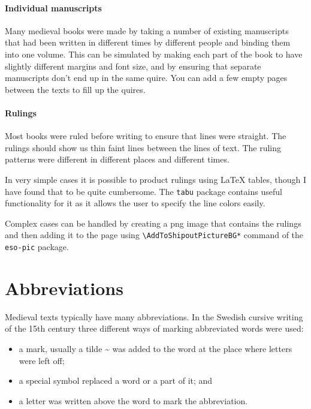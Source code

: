 \documentclass[a4paper]{article}
\newcommand{\package}[1]{\texttt{#1}}
\newcommand{\ltxncmd}[1]{\texttt{\textbackslash{}#1}}
\begin{document}
\paragraph{Individual manuscripts}

Many medieval books were made by taking a number of existing
manuscripts that had been written in different times by different
people and binding them into one volume. This can be simulated by
making each part of the book to have slightly different margins and
font size, and by ensuring that separate manuscripts don't end up in
the same quire. You can add a few empty pages between the texts to
fill up the quires.

\paragraph{Rulings}

Most books were ruled before writing to ensure that lines were
straight. The rulings should show us thin faint lines between the
lines of text. The ruling patterns were different in different places
and different times. 

In very simple cases it is possible to product rulings using LaTeX
tables, though I have found that to be quite cumbersome. The
\package{tabu} package contains useful functionality for it as it
allows the user to specify the line colors easily.

Complex cases can be handled by creating a png image that contains the
rulings and then adding it to the page using
\ltxncmd{AddToShipoutPictureBG*} command of the \package{eso-pic}
package.



\section{Abbreviations}\label{sec_abbrs}

Medieval texts typically have many abbreviations. In the Swedish
cursive writing of the 15th century three different ways of marking
abbreviated words were used:

\begin{itemize}
\item a mark, usually a tilde \~{} was added to the word at the place
  where letters were left off;
\item a special symbol replaced a word or a part of it; and
\item a letter was written above the word to mark the abbreviation.
\end{itemize}
\end{document}
